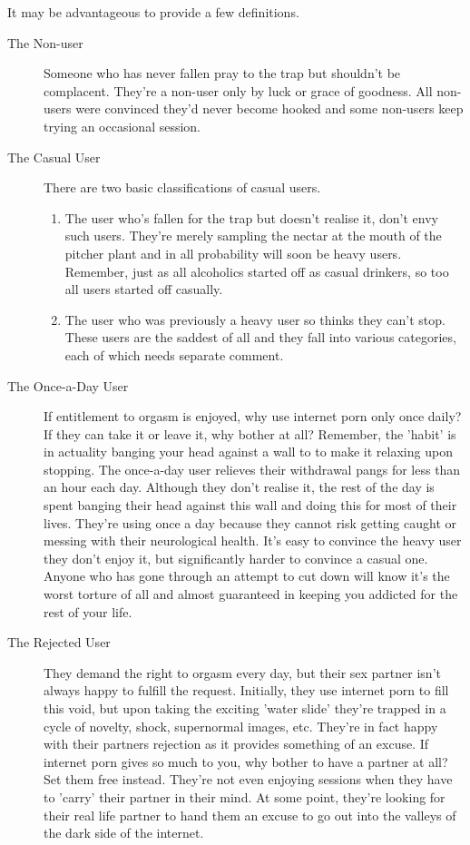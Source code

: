 \documentclass[easypeasy]{subfiles}
\begin{document}
It may be advantageous to provide a few definitions.
 \begin{description} 
   \item [The Non-user] Someone who has never fallen pray to the trap but shouldn't be complacent. They're a non-user only by luck or grace of goodness. All non-users were convinced they'd never become hooked and some non-users keep trying an occasional session.

   \item [The Casual User] There are two basic classifications of casual users.
\begin{enumerate}
\item The user who's fallen for the trap but doesn't realise it, don't envy such users. They're merely sampling the nectar at the mouth of the pitcher plant and in all probability will soon be heavy users. Remember, just as all alcoholics started off as casual drinkers, so too all users started off casually.

\item The user who was previously a heavy user so thinks they can't stop. These users are the saddest of all and they fall into various categories, each of which needs separate comment.
\end{enumerate}
    \item [The Once-a-Day User] If entitlement to orgasm is enjoyed, why use internet porn only once daily? If they can take it or leave it, why bother at all? Remember, the 'habit' is in actuality banging your head against a wall to to make it relaxing upon stopping. The once-a-day user relieves their withdrawal pangs for less than an hour each day. Although they don't realise it, the rest of the day is spent banging their head against this wall and doing this for most of their lives. They're using once a day because they cannot risk getting caught or messing with their neurological health. It's easy to convince the heavy user they don't enjoy it, but significantly harder to convince a casual one. Anyone who has gone through an attempt to cut down will know it's the worst torture of all and almost guaranteed in keeping you addicted for the rest of your life.

    \item [The Rejected User] They demand the right to orgasm every day, but their sex partner isn't always happy to fulfill the request. Initially, they use internet porn to fill this void, but upon taking the exciting 'water slide' they're trapped in a cycle of novelty, shock, supernormal images, etc. They're in fact happy with their partners rejection as it provides something of an excuse. If internet porn gives so much to you, why bother to have a partner at all? Set them free instead. They're not even enjoying sessions when they have to 'carry' their partner in their mind. At some point, they're looking for their real life partner to hand them an excuse to go out into the valleys of the dark side of the internet.


\end{description}
\end{document}
